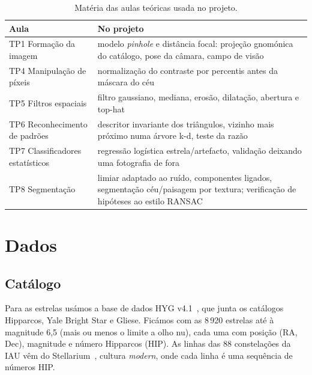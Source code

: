 \documentclass[11pt,a4paper]{article}
\begin{document}
\begin{table}[H]
  \centering
  \caption{Matéria das aulas teóricas usada no projeto.}
  \label{tab:materia}
  \begin{tabular}{@{}lp{9.5cm}@{}}
    \toprule
    Aula & No projeto \\
    \midrule
    TP1 Formação da imagem & modelo \emph{pinhole} e distância focal: projeção
      gnomónica do catálogo, pose da câmara, campo de visão \\
    TP4 Manipulação de píxeis & normalização do contraste por percentis antes
      da máscara do céu \\
    TP5 Filtros espaciais & filtro gaussiano, mediana, erosão, dilatação,
      abertura e top-hat \\
    TP6 Reconhecimento de padrões & descritor invariante dos triângulos,
      vizinho mais próximo numa árvore k-d, teste da razão \\
    TP7 Classificadores estatísticos & regressão logística estrela/artefacto,
      validação deixando uma fotografia de fora \\
    TP8 Segmentação & limiar adaptado ao ruído, componentes ligados,
      segmentação céu/paisagem por textura; verificação de hipóteses ao estilo
      RANSAC \\
    \bottomrule
  \end{tabular}
\end{table}

\section{Dados}

\subsection{Catálogo}
Para as estrelas usámos a base de dados HYG v4.1~\cite{hyg}, que junta os
catálogos Hipparcos, Yale Bright Star e Gliese. Ficámos com as 8\,920
estrelas até à magnitude 6,5 (mais ou menos o limite a olho nu), cada uma com
posição (RA, Dec), magnitude e número Hipparcos (HIP). As linhas das 88
constelações da IAU vêm do Stellarium~\cite{stellarium}, cultura
\emph{modern}, onde cada linha é uma sequência de números HIP.
\end{document}
